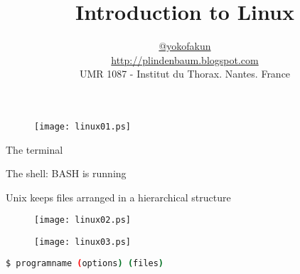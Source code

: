 \documentclass{beamer}
\title{Introduction to Linux}
\author{\href{https://twitter.com/yokofakun}{@yokofakun}\\\url{http://plindenbaum.blogspot.com}\\UMR 1087 - Institut du Thorax. Nantes. France}
\begin{document}
\begin{frame}
\titlepage
\end{frame}



\begin{frame}
\begin{figure}
\texttt{[image: linux01.ps]}
\end{figure}
\end{frame}

\begin{frame}[fragile]
 \begin{center}
    \huge{The terminal}\\
  \end{center}
\end{frame}

\begin{frame}[fragile]
 \begin{center}
    \huge{The shell: BASH is running}\\
  \end{center}
\end{frame}

\begin{frame}[fragile]
 \begin{center}
    \huge{Unix keeps files arranged in a hierarchical structure}\\
  \end{center}
\end{frame}


\begin{frame}
\begin{figure}
\texttt{[image: linux02.ps]}
\end{figure}
\end{frame}

\begin{frame}
\begin{figure}
\texttt{[image: linux03.ps]}
\end{figure}
\end{frame}


\begin{frame}[fragile]
\begin{lstlisting}[language=bash]
$ programname (options) (files)
\end{lstlisting}
\end{frame}
\end{document}
